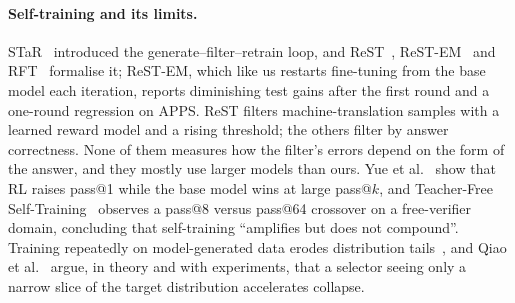 \documentclass[runningheads]{llncs}
\begin{document}
\paragraph{Self-training and its limits.}
STaR~\cite{ref_star} introduced the generate--filter--retrain loop, and
ReST~\cite{ref_rest}, ReST-EM~\cite{ref_restem} and RFT~\cite{ref_rft} formalise
it; ReST-EM, which like us restarts fine-tuning from the base model each
iteration, reports diminishing test gains after the first round and a one-round
regression on APPS. ReST filters machine-translation samples with a learned
reward model and a rising threshold; the others filter by answer correctness.
None of them measures how the filter's errors depend on the form of the answer,
and they mostly use larger models than ours. Yue et al.~\cite{ref_rllimit} show that RL
raises pass@1 while the base model wins at large pass@$k$, and Teacher-Free
Self-Training~\cite{ref_teacherfree} observes a pass@8 versus pass@64 crossover on
a free-verifier domain, concluding that self-training ``amplifies but does not
compound''. Training repeatedly on model-generated data erodes distribution
tails~\cite{ref_collapse}, and Qiao et al.~\cite{ref_selectionbias} argue,
in theory and with experiments, that a selector seeing only a narrow slice of
the target distribution accelerates collapse.
\end{document}
